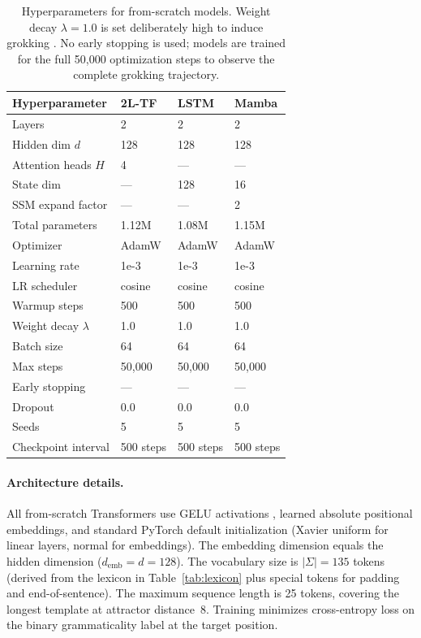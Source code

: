 \documentclass[11pt]{article}
\begin{document}
\begin{table}[t]
\centering\small
\setlength{\tabcolsep}{2.5pt}
\begin{tabular}{@{}llll@{}}
\toprule
\textbf{Hyperparameter} & \textbf{2L-TF} & \textbf{LSTM} & \textbf{Mamba} \\
\midrule
Layers              & 2       & 2       & 2       \\
Hidden dim $d$      & 128     & 128     & 128     \\
Attention heads $H$ & 4       & ---     & ---     \\
State dim           & ---     & 128     & 16      \\
SSM expand factor   & ---     & ---     & 2       \\
Total parameters    & 1.12M   & 1.08M   & 1.15M   \\
\midrule
Optimizer           & AdamW   & AdamW   & AdamW   \\
Learning rate       & 1e-3    & 1e-3    & 1e-3    \\
LR scheduler        & cosine  & cosine  & cosine  \\
Warmup steps        & 500     & 500     & 500     \\
Weight decay $\lambda$ & 1.0  & 1.0     & 1.0     \\
Batch size          & 64      & 64      & 64      \\
Max steps           & 50{,}000 & 50{,}000 & 50{,}000 \\
Early stopping      & ---     & ---     & ---     \\
Dropout             & 0.0     & 0.0     & 0.0     \\
\midrule
Seeds               & 5       & 5       & 5       \\
Checkpoint interval & 500 steps & 500 steps & 500 steps \\
\bottomrule
\end{tabular}
\caption{Hyperparameters for from-scratch models. Weight decay $\lambda{=}1.0$ is set deliberately high to induce grokking \citep{DBLP:journals/corr/abs-2201-02177}. No early stopping is used; models are trained for the full 50{,}000 optimization steps to observe the complete grokking trajectory.}
\label{tab:hyperparams}
\end{table}

\paragraph{Architecture details.}
All from-scratch Transformers use GELU activations \citep{DBLP:journals/corr/HendrycksG16}, learned absolute positional embeddings, and standard PyTorch default initialization (Xavier uniform for linear layers, normal for embeddings).
The embedding dimension equals the hidden dimension ($d_\text{emb} = d = 128$).
The vocabulary size is $|\Sigma| = 135$ tokens (derived from the lexicon in Table~\ref{tab:lexicon} plus special tokens for padding and end-of-sentence).
The maximum sequence length is 25 tokens, covering the longest template at attractor distance~8.
Training minimizes cross-entropy loss on the binary grammaticality label at the target position.
\end{document}
